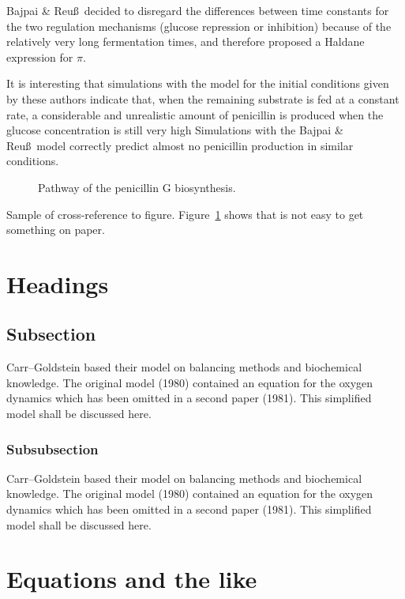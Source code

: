 \documentclass[aoas,preprint]{imsart}
\numberwithin{equation}{section}
\theoremstyle{plain}
\begin{document}
{Bajpai \& Reu\ss\ decided to disregard the
differences between time constants for the two regulation mechanisms
(glucose repression or inhibition) because of the
relatively very long fermentation times, and therefore proposed a Haldane
expression for $\pi$.

It is interesting that simulations with the \cite{r4} model for the
initial conditions given by these authors indicate that, when the
remaining substrate is fed at a constant rate, a considerable and
unrealistic amount of penicillin is
produced when the glucose concentration is still very high \cite{r2,r3,r4}
Simulations with the Bajpai \& Reu\ss\ model correctly predict almost
no penicillin production in similar conditions.

\begin{figure} %
\vspace{6pc}
\caption[]{Pathway of the penicillin G biosynthesis.}
\label{penG}
\end{figure}

Sample of cross-reference to figure.
Figure~\ref{penG} shows that is not easy to get something on paper.



\section{Headings}

\subsection{Subsection}
Carr--Goldstein based their model on balancing methods and
biochemical know\-ledge. The original model (1980) contained an equation for the
oxygen dynamics which has been omitted in a second paper
(1981). This simplified model shall be discussed here.

\subsubsection{Subsubsection}
Carr--Goldstein
based their model on balancing methods and
biochemical know\-ledge. The original model (1980) contained an equation for the
oxygen dynamics which has been omitted in a second paper
(1981). This simplified model shall be discussed here.

\section{Equations and the like}

}
\end{document}
